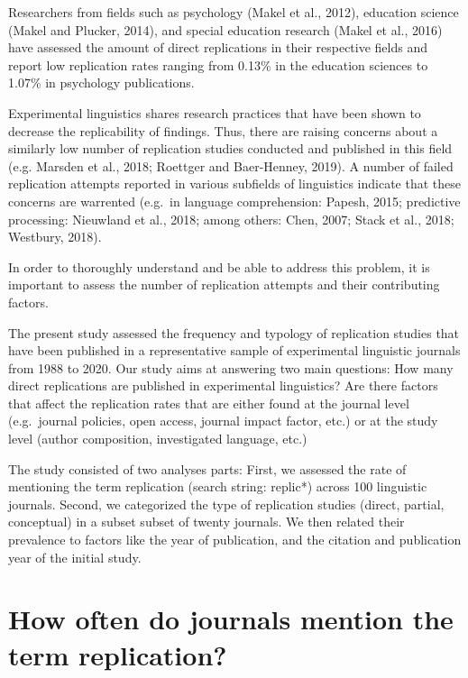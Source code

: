 \documentclass[]{elsarticle} %
\begin{document}
Researchers from fields such as psychology (Makel et al., 2012),
education science (Makel and Plucker, 2014), and special education
research (Makel et al., 2016) have assessed the amount of direct
replications in their respective fields and report low replication rates
ranging from 0.13\% in the education sciences to 1.07\% in psychology
publications.

Experimental linguistics shares research practices that have been shown
to decrease the replicability of findings. Thus, there are raising
concerns about a similarly low number of replication studies conducted
and published in this field (e.g. Marsden et al., 2018; Roettger and
Baer-Henney, 2019). A number of failed replication attempts reported in
various subfields of linguistics indicate that these concerns are
warrented (e.g.~in language comprehension: Papesh, 2015; predictive
processing: Nieuwland et al., 2018; among others: Chen, 2007; Stack et
al., 2018; Westbury, 2018).

In order to thoroughly understand and be able to address this problem,
it is important to assess the number of replication attempts and their
contributing factors.

The present study assessed the frequency and typology of replication
studies that have been published in a representative sample of
experimental linguistic journals from 1988 to 2020. Our study aims at
answering two main questions: How many direct replications are published
in experimental linguistics? Are there factors that affect the
replication rates that are either found at the journal level
(e.g.~journal policies, open access, journal impact factor, etc.) or at
the study level (author composition, investigated language, etc.)

The study consisted of two analyses parts: First, we assessed the rate
of mentioning the term replication (search string: replic*) across 100
linguistic journals. Second, we categorized the type of replication
studies (direct, partial, conceptual) in a subset subset of twenty
journals. We then related their prevalence to factors like the year of
publication, and the citation and publication year of the initial study.

\hypertarget{how-often-do-journals-mention-the-term-replication}{%
\section{How often do journals mention the term
replication?}\label{how-often-do-journals-mention-the-term-replication}}
\end{document}
